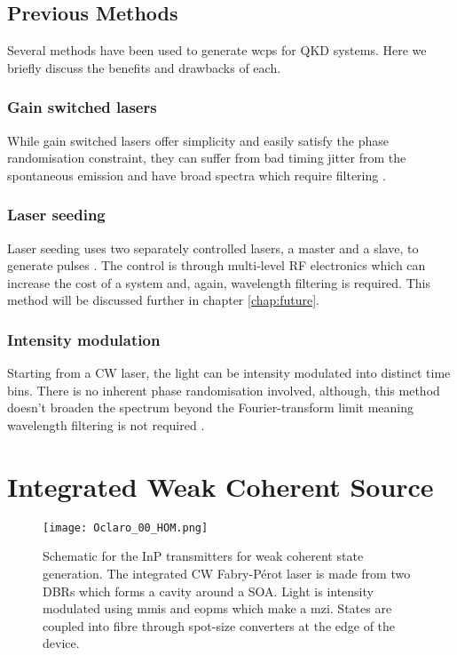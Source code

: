 \subsection{Previous Methods}

Several methods have been used to generate \acp{wcp} for \ac{QKD} systems. Here we briefly discuss the benefits and drawbacks of each.

\subsubsection*{Gain switched lasers}

While gain switched lasers offer simplicity and easily satisfy the phase randomisation constraint, they can suffer from bad timing jitter from the spontaneous emission and have broad spectra which require filtering \cite{Agnesi2019}.


\subsubsection*{Laser seeding}

Laser seeding uses two separately controlled lasers, a master and a slave, to generate pulses \cite{Comandar2016PLS}. The control is through multi-level RF electronics which can increase the cost of a system and, again, wavelength filtering is required. This method will be discussed further in chapter \ref{chap:future}.


\subsubsection*{Intensity modulation}

Starting from a \ac{CW} laser, the light can be intensity modulated into distinct time bins. There is no inherent phase randomisation involved, although, this method doesn't broaden the spectrum beyond the Fourier-transform limit meaning wavelength filtering is not required \cite{Sibson2017InP}.

\section{Integrated Weak Coherent Source}

\begin{figure}[tp]
	\centering
	\texttt{[image: Oclaro\_00\_HOM.png]}
	\caption[Schematic of the integrated transmitters for weak coherent state generation]{Schematic for the \ac{InP} transmitters for weak coherent state generation. The integrated \ac{CW} Fabry-P\'{e}rot laser is made from two \acfp{DBR} which forms a cavity around a \acf{SOA}. Light is intensity modulated using \acfp{mmi} and \acfp{eopm} which make a \acf{mzi}. States are coupled into fibre through spot-size converters at the edge of the device.}
	\label{fig:hom_chip}
\end{figure}

